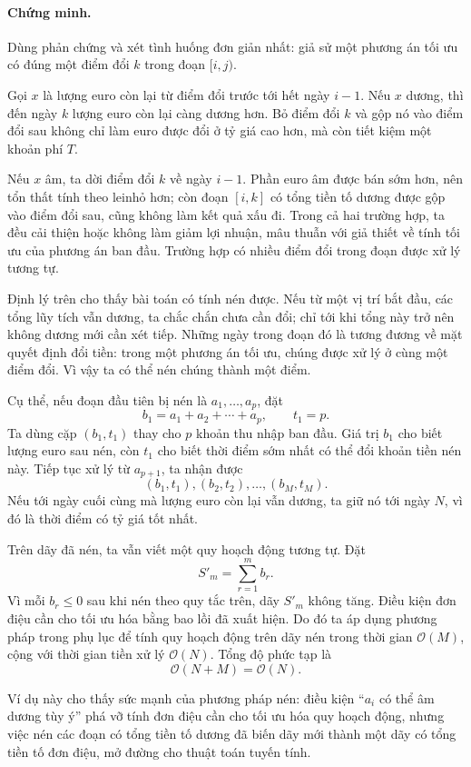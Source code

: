 \documentclass[11pt]{article}
\newcommand{\Oh}{\mathcal{O}}
\newcommand{\lei}{\ensuremath{\mathrm{lei}}}
\begin{document}
\paragraph{Chứng minh.}
Dùng phản chứng và xét tình huống đơn giản nhất: giả sử một phương án tối ưu
có đúng một điểm đổi $k$ trong đoạn $[i,j)$.

Gọi $x$ là lượng euro còn lại từ điểm đổi trước tới hết ngày $i-1$. Nếu $x$
dương, thì đến ngày $k$ lượng euro còn lại càng dương hơn. Bỏ điểm đổi $k$ và
gộp nó vào điểm đổi sau không chỉ làm euro được đổi ở tỷ giá cao hơn, mà còn
tiết kiệm một khoản phí $T$.

Nếu $x$ âm, ta dời điểm đổi $k$ về ngày $i-1$. Phần euro âm được bán sớm hơn,
nên tổn thất tính theo \lei nhỏ hơn; còn đoạn $[i,k]$ có tổng tiền tố dương
được gộp vào điểm đổi sau, cũng không làm kết quả xấu đi. Trong cả hai trường
hợp, ta đều cải thiện hoặc không làm giảm lợi nhuận, mâu thuẫn với giả thiết
về tính tối ưu của phương án ban đầu. Trường hợp có nhiều điểm đổi trong đoạn
được xử lý tương tự.

Định lý trên cho thấy bài toán có tính nén được. Nếu từ một vị trí bắt đầu,
các tổng lũy tích vẫn dương, ta chắc chắn chưa cần đổi; chỉ tới khi tổng này
trở nên không dương mới cần xét tiếp. Những ngày trong đoạn đó là tương đương
về mặt quyết định đổi tiền: trong một phương án tối ưu, chúng được xử lý ở
cùng một điểm đổi. Vì vậy ta có thể nén chúng thành một điểm.

Cụ thể, nếu đoạn đầu tiên bị nén là $a_1,\ldots,a_p$, đặt
\[
  b_1=a_1+a_2+\cdots+a_p,\qquad t_1=p.
\]
Ta dùng cặp $(b_1,t_1)$ thay cho $p$ khoản thu nhập ban đầu. Giá trị $b_1$
cho biết lượng euro sau nén, còn $t_1$ cho biết thời điểm sớm nhất có thể đổi
khoản tiền nén này. Tiếp tục xử lý từ $a_{p+1}$, ta nhận được
\[
  (b_1,t_1),(b_2,t_2),\ldots,(b_M,t_M).
\]
Nếu tới ngày cuối cùng mà lượng euro còn lại vẫn dương, ta giữ nó tới ngày
$N$, vì đó là thời điểm có tỷ giá tốt nhất.

Trên dãy đã nén, ta vẫn viết một quy hoạch động tương tự. Đặt
\[
  S'_m=\sum_{r=1}^{m}b_r.
\]
Vì mỗi $b_r\le 0$ sau khi nén theo quy tắc trên, dãy $S'_m$ không tăng. Điều
kiện đơn điệu cần cho tối ưu hóa bằng bao lồi đã xuất hiện. Do đó ta áp dụng
phương pháp trong phụ lục để tính quy hoạch động trên dãy nén trong thời gian
$\Oh(M)$, cộng với thời gian tiền xử lý $\Oh(N)$. Tổng độ phức tạp là
\[
  \Oh(N+M)=\Oh(N).
\]

Ví dụ này cho thấy sức mạnh của phương pháp nén: điều kiện ``$a_i$ có thể âm
dương tùy ý'' phá vỡ tính đơn điệu cần cho tối ưu hóa quy hoạch động, nhưng
việc nén các đoạn có tổng tiền tố dương đã biến dãy mới thành một dãy có tổng
tiền tố đơn điệu, mở đường cho thuật toán tuyến tính.
\end{document}
